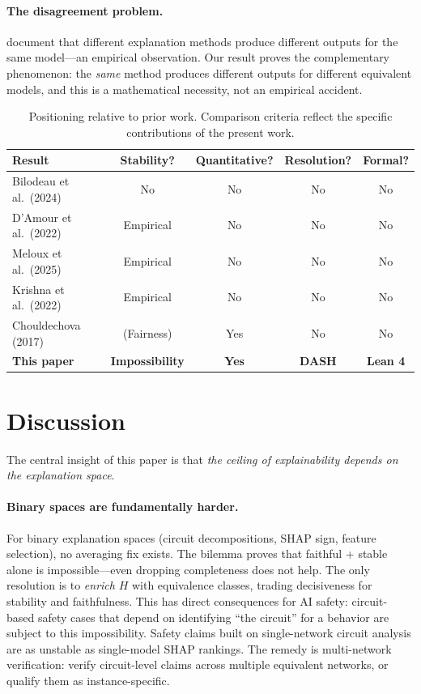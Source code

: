 \paragraph{The disagreement problem.}
\citet{krishna2022disagreement} document that different explanation methods produce different outputs for the same model---an empirical observation. Our result proves the complementary phenomenon: the \emph{same} method produces different outputs for different equivalent models, and this is a mathematical necessity, not an empirical accident.

\begin{table}[t]
\centering
\caption{Positioning relative to prior work. Comparison criteria reflect the specific contributions of the present work.}
\label{tab:prior-work}
\small
\begin{tabular}{@{}lcccc@{}}
\toprule
Result & Stability? & Quantitative? & Resolution? & Formal? \\
\midrule
Bilodeau et al.\ (2024) & No & No & No & No \\
D'Amour et al.\ (2022) & Empirical & No & No & No \\
Meloux et al.\ (2025) & Empirical & No & No & No \\
Krishna et al.\ (2022) & Empirical & No & No & No \\
Chouldechova (2017) & (Fairness) & Yes & No & No \\
\textbf{This paper} & \textbf{Impossibility} & \textbf{Yes} & \textbf{DASH} & \textbf{Lean 4} \\
\bottomrule
\end{tabular}
\end{table}



\section{Discussion}
\label{sec:discussion}

The central insight of this paper is that \emph{the ceiling of explainability depends on the explanation space}.

\paragraph{Binary spaces are fundamentally harder.}
For binary explanation spaces (circuit decompositions, SHAP sign, feature selection), no averaging fix exists. The bilemma proves that faithful + stable alone is impossible---even dropping completeness does not help. The only resolution is to \emph{enrich} $H$ with equivalence classes, trading decisiveness for stability and faithfulness. This has direct consequences for AI safety: circuit-based safety cases that depend on identifying ``the circuit'' for a behavior are subject to this impossibility. Safety claims built on single-network circuit analysis are as unstable as single-model SHAP rankings. The remedy is multi-network verification: verify circuit-level claims across multiple equivalent networks, or qualify them as instance-specific.

